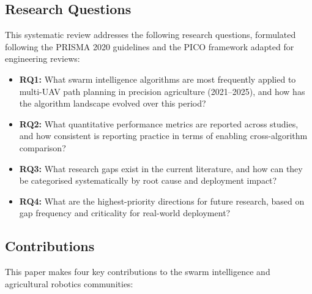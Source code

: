 \documentclass[review,3p,times]{elsarticle}
\begin{document}
\subsection{Research Questions}

This systematic review addresses the following research questions, formulated following the PRISMA 2020 guidelines \cite{page2021} and the PICO framework adapted for engineering reviews:

\begin{itemize}
  \item \textbf{RQ1:} What swarm intelligence algorithms are most frequently applied to multi-UAV path planning in precision agriculture (2021--2025), and how has the algorithm landscape evolved over this period?
  \item \textbf{RQ2:} What quantitative performance metrics are reported across studies, and how consistent is reporting practice in terms of enabling cross-algorithm comparison?
  \item \textbf{RQ3:} What research gaps exist in the current literature, and how can they be categorised systematically by root cause and deployment impact?
  \item \textbf{RQ4:} What are the highest-priority directions for future research, based on gap frequency and criticality for real-world deployment?
\end{itemize}

\subsection{Contributions}

This paper makes four key contributions to the swarm intelligence and agricultural robotics communities:
\end{document}
